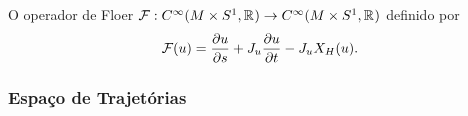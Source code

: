 \documentclass{beamer}
\begin{document}
\begin{footnotesize}
\begin{frame}
\begin{itemize}
		 \end{itemize} 		
			
		\begin{definition} O operador de Floer $\mathcal{F}:C^{\infty}(M\times S^{1}, \mathbb{R}^{})\to C^{\infty}(M\times S^{1}, \mathbb{R}^{})$ definido por  $$ \mathcal{F}(u)=\frac{\partial u}{\partial s} + J_{u}\frac{\partial u}{\partial t} - J_{u}X_{H}(u). 	$$ \end{definition}
		
		\end{frame}
	

	
	\begin{frame}
		\frametitle{Espaço de Trajetórias }
		\begin{itemize}
			

\end{itemize}
\end{frame}
\end{footnotesize}
\end{document}
